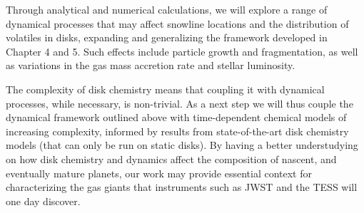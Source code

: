 Through analytical and numerical calculations, we will explore a range of dynamical processes that may affect snowline locations and the distribution of volatiles in disks, expanding and generalizing the framework developed in Chapter 4 and 5. Such effects include particle growth and fragmentation, as well as variations in the gas mass accretion rate and stellar luminosity.

The complexity of disk chemistry means that coupling it with dynamical processes, while necessary, is non-trivial. As a next step we will thus couple the dynamical framework outlined above with time-dependent chemical models of increasing complexity, informed by results from state-of-the-art disk chemistry models (that can only be run on static disks).  By having a better understudying on how disk chemistry and dynamics affect the composition of nascent, and eventually mature planets, our work may provide essential context for characterizing the gas giants
that instruments such as JWST and the TESS will one day discover.  
 
